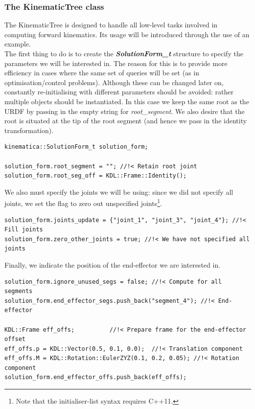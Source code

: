 \documentclass[12pt,a4paper,onecolumn]{article}
\begin{document}
\subsubsection*{The KinematicTree class}
The KinematicTree is designed to handle all low-level tasks involved in computing forward kinematics. Its usage will be introduced through the use of an example.\\
\newline
\noindent The first thing to do is to create the \textbf{\textit{SolutionForm\_t}} structure to specify the parameters we will be interested in. The reason for this is to provide more efficiency in cases where the same set of queries will be set (as in optimisation/control problems). Although these can be changed later on, constantly re-initialising with different parameters should be avoided: rather multiple objects should be instantiated. In this case we keep the same root as the URDF by passing in the empty string for \textit{root\_segment}. We also desire that the root is situated at the tip of the root segment (and hence we pass in the identity transformation).

\begin{lstlisting}
kinematica::SolutionForm_t solution_form;
  
solution_form.root_segment = ""; //!< Retain root joint
solution_form.root_seg_off = KDL::Frame::Identity();
\end{lstlisting}

\noindent We also must specify the joints we will be using: since we did not specify all joints, we set the flag to zero out unspecified joints\footnote{Note that the initialiser-list syntax requires C++11.}. 

\begin{lstlisting}
solution_form.joints_update = {"joint_1", "joint_3", "joint_4"}; //!< Fill joints
solution_form.zero_other_joints = true; //!< We have not specified all joints
\end{lstlisting}

\noindent Finally, we indicate the position of the end-effector we are interested in.

\begin{lstlisting}
solution_form.ignore_unused_segs = false; //!< Compute for all segments
solution_form.end_effector_segs.push_back("segment_4"); //!< End-effector
 
KDL::Frame eff_offs;          //!< Prepare frame for the end-effector offset
eff_offs.p = KDL::Vector(0.5, 0.1, 0.0);  //!< Translation component
eff_offs.M = KDL::Rotation::EulerZYZ(0.1, 0.2, 0.05); //!< Rotation component
solution_form.end_effector_offs.push_back(eff_offs);
\end{lstlisting}
\end{document}
